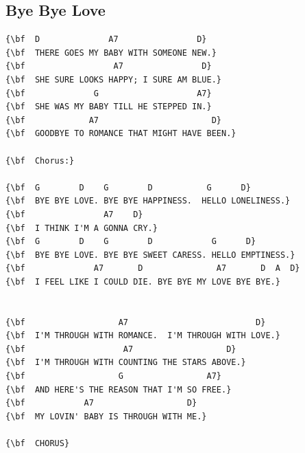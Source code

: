 \documentclass[a4paper]{article}
\begin{document}
\subsection{Bye Bye Love}
\begin{Verbatim}[commandchars=\\\{\}]
{\bf  D              A7                D}
{\bf  THERE GOES MY BABY WITH SOMEONE NEW.}
{\bf                  A7                D}
{\bf  SHE SURE LOOKS HAPPY; I SURE AM BLUE.}
{\bf              G                    A7}
{\bf  SHE WAS MY BABY TILL HE STEPPED IN.}
{\bf             A7                       D}
{\bf  GOODBYE TO ROMANCE THAT MIGHT HAVE BEEN.}

{\bf  Chorus:}

{\bf  G        D    G        D           G      D}
{\bf  BYE BYE LOVE. BYE BYE HAPPINESS.  HELLO LONELINESS.}
{\bf                A7    D}
{\bf  I THINK I'M A GONNA CRY.}
{\bf  G        D    G        D            G      D}
{\bf  BYE BYE LOVE. BYE BYE SWEET CARESS. HELLO EMPTINESS.}
{\bf              A7       D               A7       D  A  D}
{\bf  I FEEL LIKE I COULD DIE. BYE BYE MY LOVE BYE BYE.}


{\bf                   A7                          D}
{\bf  I'M THROUGH WITH ROMANCE.  I'M THROUGH WITH LOVE.}
{\bf                    A7                   D}
{\bf  I'M THROUGH WITH COUNTING THE STARS ABOVE.}
{\bf                   G                 A7}
{\bf  AND HERE'S THE REASON THAT I'M SO FREE.}
{\bf            A7                   D}
{\bf  MY LOVIN' BABY IS THROUGH WITH ME.}

{\bf  CHORUS}

\end{Verbatim}
\newpage
\end{document}
